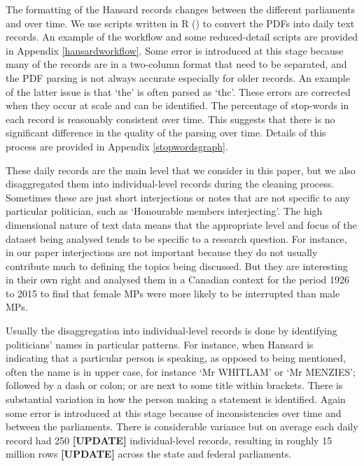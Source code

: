 \documentclass[12pt,]{article}
\theoremstyle{definition}
\theoremstyle{definition}
\theoremstyle{definition}
\theoremstyle{remark}
\begin{document}
The formatting of the Hansard records changes between the different
parliaments and over time. We use scripts written in R (\citet{R2018})
to convert the PDFs into daily text records. An example of the workflow
and some reduced-detail scripts are provided in Appendix
\ref{hansardworkflow}. Some error is introduced at this stage because
many of the records are in a two-column format that need to be
separated, and the PDF parsing is not always accurate especially for
older records. An example of the latter issue is that `the' is often
parsed as `thc'. These errors are corrected when they occur at scale and
can be identified. The percentage of stop-words in each record is
reasonably consistent over time. This suggests that there is no
significant difference in the quality of the parsing over time. Details
of this process are provided in Appendix \ref{stopwordsgraph}.

These daily records are the main level that we consider in this paper,
but we also disaggregated them into individual-level records during the
cleaning process. Sometimes these are just short interjections or notes
that are not specific to any particular politician, such as `Honourable
members interjecting'. The high dimensional nature of text data means
that the appropriate level and focus of the dataset being analysed tends
to be specific to a research question. For instance, in our paper
interjections are not important because they do not usually contribute
much to defining the topics being discussed. But they are interesting in
their own right and \citet{Whyte2017} analysed them in a Canadian
context for the period 1926 to 2015 to find that female MPs were more
likely to be interrupted than male MPs.

Usually the disaggregation into individual-level records is done by
identifying politicians' names in particular patterns. For instance,
when Hansard is indicating that a particular person is speaking, as
opposed to being mentioned, often the name is in upper case, for
instance `Mr WHITLAM' or `Mr MENZIES'; followed by a dash or colon; or
are next to some title within brackets. There is substantial variation
in how the person making a statement is identified. Again some error is
introduced at this stage because of inconsistencies over time and
between the parliaments. There is considerable variance but on average
each daily record had 250 \textbf{{[}UPDATE{]}} individual-level
records, resulting in roughly 15 million rows \textbf{{[}UPDATE{]}}
across the state and federal parliaments.
\end{document}
